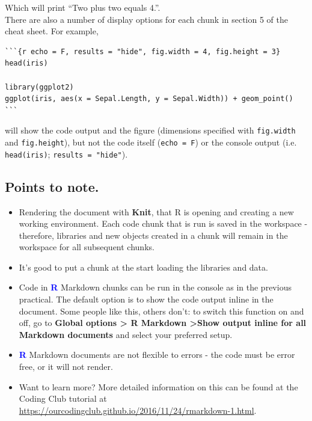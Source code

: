 \documentclass[a4paper,12pt]{article}
\newcommand\boldblue[1]{\textcolor{blue}{\textbf{#1}}}
\begin{document}
Which will print ``Two plus two equals 4.''. \\

There are also a number of display options for each chunk in section 5 of the cheat sheet. For example, 

\begin{shaded}
\begin{verbatim}
```{r echo = F, results = "hide", fig.width = 4, fig.height = 3}
head(iris)

library(ggplot2)
ggplot(iris, aes(x = Sepal.Length, y = Sepal.Width)) + geom_point()
```
\end{verbatim}
\end{shaded}

will show the code output and the figure (dimensions specified with \texttt{fig.width} and \texttt{fig.height}), but not the code itself (\texttt{echo = F}) or the console output (i.e. \texttt{head(iris)}; \texttt{results = "hide"}). \\

\subsection{Points to note.}

\begin{itemize}
\item Rendering the document with \textbf{Knit}, that R is opening and creating a new working environment. Each code chunk that is run is saved in the workspace - therefore, libraries and new objects created in a chunk will remain in the workspace for all subsequent chunks. 

\item It's good to put a chunk at the start loading the libraries and data.

\item Code in \boldblue{R} Markdown chunks can be run in the console as in the previous practical. The default option is to show the code output inline in the document. Some people like this, others don't: to switch this function on and off, go to \textbf{Global options > R Markdown >Show output inline for all Markdown documents} and select your preferred setup. 

\item \boldblue{R} Markdown documents are not flexible to errors - the code must be error free, or it will not render. 

\item Want to learn more? More detailed information on this can be found at the Coding Club tutorial at \url{https://ourcodingclub.github.io/2016/11/24/rmarkdown-1.html}.

\end{itemize}
\end{document}
